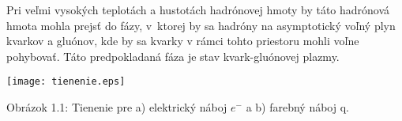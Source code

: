 Pri veľmi vysokých teplotách a hustotách hadrónovej hmoty
by táto hadrónová hmota mohla prejsť do fázy, v~ktorej by
sa hadróny  na asymptotický voľný plyn kvarkov a
gluónov, kde by sa kvarky v rámci tohto priestoru mohli voľne  pohybovať.
Táto predpokladaná fáza je stav kvark-gluónovej plazmy.

\newpage

\begin{center}
\texttt{[image: tienenie.eps]}
\end{center}

\begin{center}
Obrázok 1.1: Tienenie pre a) elektrický náboj $e^{-}$ a b) farebný 
náboj q.
\end{center}

